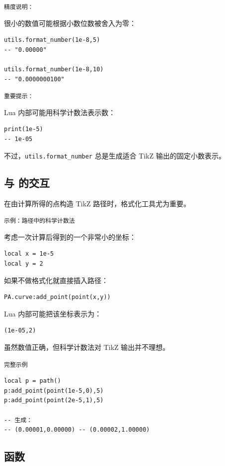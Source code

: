 \medskip
\texttt{精度说明： }

很小的数值可能根据小数位数被舍入为零：

\begin{verbatim}
utils.format_number(1e-8,5)
-- "0.00000"

utils.format_number(1e-8,10)
-- "0.0000000100"
\end{verbatim}

\texttt{重要提示： }

Lua 内部可能用科学计数法表示数：

\begin{verbatim}
print(1e-5)
-- 1e-05
\end{verbatim}

不过，\verb|utils.format_number| 总是生成适合 TikZ 输出的固定小数表示。

\subsection{与  的交互}

在由计算所得的点构造 TikZ 路径时，格式化工具尤为重要。

\texttt{示例：路径中的科学计数法}

考虑一次计算后得到的一个非常小的坐标：

\begin{verbatim}
local x = 1e-5
local y = 2
\end{verbatim}

如果不做格式化就直接插入路径：

\begin{verbatim}
PA.curve:add_point(point(x,y))
\end{verbatim}

Lua 内部可能把该坐标表示为：

\begin{verbatim}
(1e-05,2)
\end{verbatim}

虽然数值正确，但科学计数法对 TikZ 输出并不理想。


\texttt{完整示例}

\begin{verbatim}
local p = path()
p:add_point(point(1e-5,0),5)
p:add_point(point(2e-5,1),5)

-- 生成：
-- (0.00001,0.00000) -- (0.00002,1.00000)
\end{verbatim}





\subsection{函数 }
\label{sub:function_utils_checknumber}

